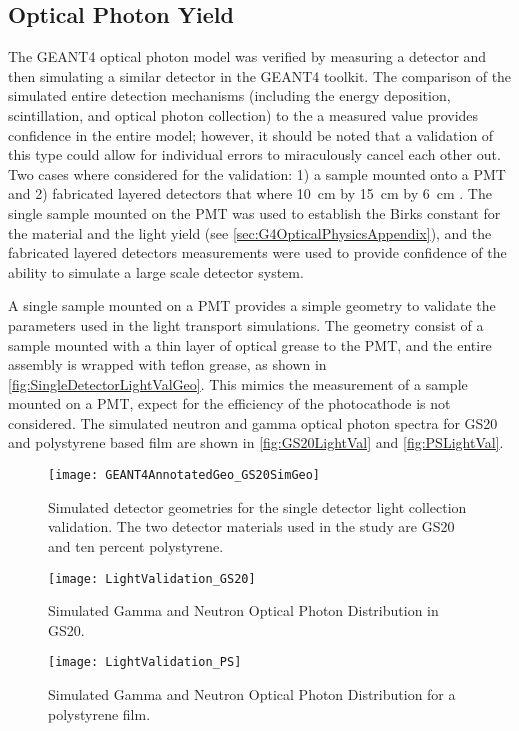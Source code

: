 \subsection{Optical Photon Yield}
\label{sec:OpticalPhotonValidation}
The GEANT4 optical photon model was verified by measuring a detector and then simulating a similar detector in the GEANT4 toolkit. 
The comparison of the simulated entire  detection mechanisms (including the energy deposition, scintillation, and optical photon collection) to the a measured value provides confidence in the entire model; however, it should be noted that a validation of this type could allow for individual errors to miraculously cancel each other out.
Two cases where considered for the validation: 1) a sample mounted onto a PMT and 2) fabricated layered detectors that where  \SI{10}{cm} by \SI{15}{cm} by \SI{6}{cm} .
The single sample mounted on the PMT was used to establish the Birks constant for the material and the light yield (see \autoref{sec:G4OpticalPhysicsAppendix}), and the fabricated layered detectors measurements were used to provide confidence of the ability to simulate a large scale detector system.

A single sample mounted on a PMT provides a simple geometry to validate the parameters used in the light transport simulations. 
The geometry consist of a sample mounted with a thin layer of optical grease to the PMT, and the entire assembly is wrapped with teflon grease, as shown in \autoref{fig:SingleDetectorLightValGeo}.
This mimics the measurement of a sample mounted on a PMT, expect for the efficiency of the photocathode is not considered.
The simulated neutron and gamma optical photon spectra for GS20 and polystyrene based film are shown in \autoref{fig:GS20LightVal} and \autoref{fig:PSLightVal}.
\begin{figure}
	\centering
	\texttt{[image: GEANT4AnnotatedGeo\_GS20SimGeo]}
	\caption[Simulated Detector Geometry for Single Detectors]{Simulated detector geometries for the single detector light collection validation. The two detector materials used in the study are GS20 and ten percent  polystyrene.}
	\label{fig:SingleDetectorLightValGeo}
\end{figure}
\begin{figure}
	\centering
	\texttt{[image: LightValidation\_GS20]}
	\caption[Simulated Gamma and Neutron Optical Photon Distribution in GS20]{Simulated Gamma and Neutron Optical Photon Distribution in GS20. \LightYieldEDepSimGeo}
	\label{fig:GS20LightVal}
\end{figure}
\begin{figure}
	\centering
	\texttt{[image: LightValidation\_PS]}
  \caption[Simulated Gamma and Neutron Optical Photon Distribution for a Polystyrene Film]{Simulated Gamma and Neutron Optical Photon Distribution for a polystyrene film. \LightYieldEDepSimGeo}
	\label{fig:PSLightVal}
\end{figure}

